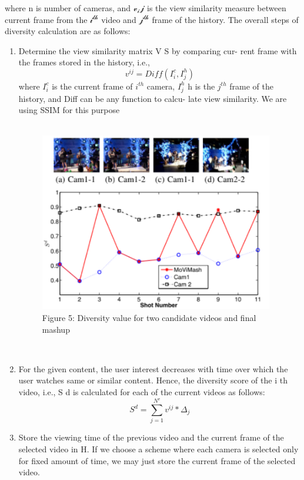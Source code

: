 \documentclass[conference]{IEEEtran}
\begin{document}
where n is number of cameras, and $\mathcal{v_ij}$ is the view similarity
measure between current frame from the $\mathcal{i^{th}}$  video and $\mathcal{j^{th}}$ frame
of the history. The overall steps of diversity
calculation are as follows:
\begin{enumerate}
    \item Determine the view similarity matrix V S by comparing cur-
rent frame with the frames stored in the history, i.e.,
\begin{equation}
v^{ij} = Diff(I_i^c,I_j^h)
\end{equation}
where ${I^{c}_i}$ is the current frame of $i^{th}$ camera, ${I^h_j}$ h is the ${j^{th}}$
frame of the history, and Diff can be any function to calcu-
late view similarity. We are using SSIM \cite{17} for this purpose\\\\
\begin{figure}
    \centering
    \includegraphics{img5.png}
    \caption{Figure 5: Diversity value for two candidate videos and final mashup}
    \label{fig:my_label}
\end{figure}
\\
    \item For the given content, the user interest decreases with time
over which the user watches same or similar content. Hence,
the diversity score of the i th video, i.e., S d is calculated for
each of the current videos as follows:
\begin{equation}
S^d = \sum_{j=1}^{N^v}v^{ij}*\Delta_j
\end{equation}

    \item Store the viewing time of the previous video and the current
frame of the selected video in H. If we choose a scheme
where each camera is selected only for fixed amount of time,
we may just store the current frame of the selected video.
\end{enumerate}
\end{document}

